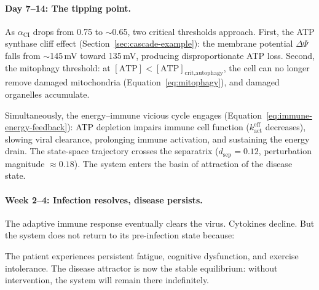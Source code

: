 \paragraph{Day 7--14: The tipping point.}
As $\alpha_{\text{CI}}$ drops from 0.75 to $\sim$0.65, two critical thresholds approach. First, the ATP synthase cliff effect (Section~\ref{sec:cascade-example}): the membrane potential $\Delta\Psi$ falls from $\sim$145\,mV toward 135\,mV, producing disproportionate ATP loss. Second, the mitophagy threshold: at $[\text{ATP}] < [\text{ATP}]_{\text{crit,autophagy}}$, the cell can no longer remove damaged mitochondria (Equation~\ref{eq:mitophagy}), and damaged organelles accumulate.

Simultaneously, the energy--immune vicious cycle engages (Equation~\ref{eq:immune-energy-feedback}): ATP depletion impairs immune cell function ($k_{\text{act}}^{\text{eff}}$ decreases), slowing viral clearance, prolonging immune activation, and sustaining the energy drain. The state-space trajectory crosses the separatrix ($d_{\text{sep}} = 0.12$, perturbation magnitude $\approx 0.18$). The system enters the basin of attraction of the disease state.

\paragraph{Week 2--4: Infection resolves, disease persists.}
The adaptive immune response eventually clears the virus. Cytokines decline. But the system does not return to its pre-infection state because:

The patient experiences persistent fatigue, cognitive dysfunction, and exercise intolerance. The disease attractor is now the stable equilibrium: without intervention, the system will remain there indefinitely.

